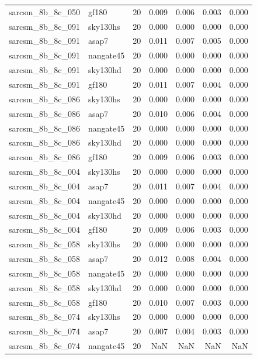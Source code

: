 \begin{tabular}{llrrrrr}
sarcsm\_8b\_8c\_050 & gf180 & 20 & 0.009 & 0.006 & 0.003 & 0.000 \\
sarcsm\_8b\_8c\_091 & sky130hs & 20 & 0.000 & 0.000 & 0.000 & 0.000 \\
sarcsm\_8b\_8c\_091 & asap7 & 20 & 0.011 & 0.007 & 0.005 & 0.000 \\
sarcsm\_8b\_8c\_091 & nangate45 & 20 & 0.000 & 0.000 & 0.000 & 0.000 \\
sarcsm\_8b\_8c\_091 & sky130hd & 20 & 0.000 & 0.000 & 0.000 & 0.000 \\
sarcsm\_8b\_8c\_091 & gf180 & 20 & 0.011 & 0.007 & 0.004 & 0.000 \\
sarcsm\_8b\_8c\_086 & sky130hs & 20 & 0.000 & 0.000 & 0.000 & 0.000 \\
sarcsm\_8b\_8c\_086 & asap7 & 20 & 0.010 & 0.006 & 0.004 & 0.000 \\
sarcsm\_8b\_8c\_086 & nangate45 & 20 & 0.000 & 0.000 & 0.000 & 0.000 \\
sarcsm\_8b\_8c\_086 & sky130hd & 20 & 0.000 & 0.000 & 0.000 & 0.000 \\
sarcsm\_8b\_8c\_086 & gf180 & 20 & 0.009 & 0.006 & 0.003 & 0.000 \\
sarcsm\_8b\_8c\_004 & sky130hs & 20 & 0.000 & 0.000 & 0.000 & 0.000 \\
sarcsm\_8b\_8c\_004 & asap7 & 20 & 0.011 & 0.007 & 0.004 & 0.000 \\
sarcsm\_8b\_8c\_004 & nangate45 & 20 & 0.000 & 0.000 & 0.000 & 0.000 \\
sarcsm\_8b\_8c\_004 & sky130hd & 20 & 0.000 & 0.000 & 0.000 & 0.000 \\
sarcsm\_8b\_8c\_004 & gf180 & 20 & 0.009 & 0.006 & 0.003 & 0.000 \\
sarcsm\_8b\_8c\_058 & sky130hs & 20 & 0.000 & 0.000 & 0.000 & 0.000 \\
sarcsm\_8b\_8c\_058 & asap7 & 20 & 0.012 & 0.008 & 0.004 & 0.000 \\
sarcsm\_8b\_8c\_058 & nangate45 & 20 & 0.000 & 0.000 & 0.000 & 0.000 \\
sarcsm\_8b\_8c\_058 & sky130hd & 20 & 0.000 & 0.000 & 0.000 & 0.000 \\
sarcsm\_8b\_8c\_058 & gf180 & 20 & 0.010 & 0.007 & 0.003 & 0.000 \\
sarcsm\_8b\_8c\_074 & sky130hs & 20 & 0.000 & 0.000 & 0.000 & 0.000 \\
sarcsm\_8b\_8c\_074 & asap7 & 20 & 0.007 & 0.004 & 0.003 & 0.000 \\
sarcsm\_8b\_8c\_074 & nangate45 & 20 & NaN & NaN & NaN & NaN \\

\end{tabular}
